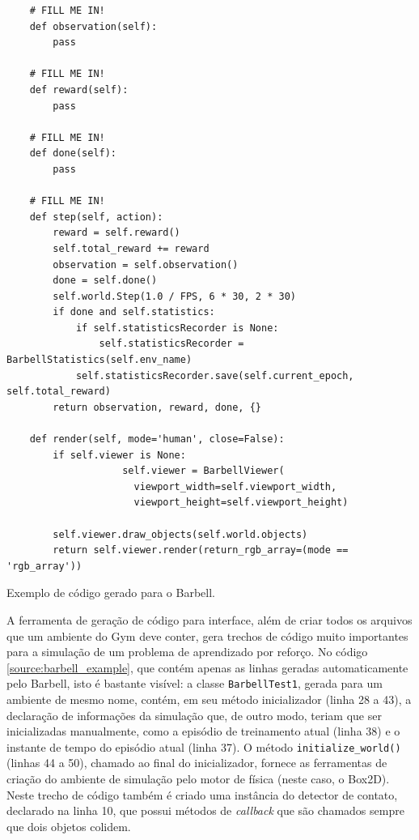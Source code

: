 \documentclass[cic,tc]{iiufrgs}
\newenvironment{longlisting}{\captionsetup{type=listing}}{}
\begin{document}
\begin{longlisting}
\begin{verbatim}
    # FILL ME IN!
    def observation(self):
        pass

    # FILL ME IN!
    def reward(self):
        pass

    # FILL ME IN!
    def done(self):
        pass

    # FILL ME IN!
    def step(self, action):
        reward = self.reward()
        self.total_reward += reward
        observation = self.observation()
        done = self.done()
        self.world.Step(1.0 / FPS, 6 * 30, 2 * 30)
        if done and self.statistics:
            if self.statisticsRecorder is None:
                self.statisticsRecorder = BarbellStatistics(self.env_name)
            self.statisticsRecorder.save(self.current_epoch, self.total_reward)
        return observation, reward, done, {}

    def render(self, mode='human', close=False):
        if self.viewer is None:
                    self.viewer = BarbellViewer(
                      viewport_width=self.viewport_width,
                      viewport_height=self.viewport_height)

        self.viewer.draw_objects(self.world.objects)
        return self.viewer.render(return_rgb_array=(mode == 'rgb_array'))

\end{verbatim}
\caption[]{Exemplo de código gerado para o Barbell.}
\label{source:barbell_example}
\end{longlisting}


A ferramenta de geração de código para interface, além de criar todos os
arquivos que um ambiente do Gym deve conter, gera trechos de código muito
importantes para a simulação de um problema de aprendizado por reforço. No
código \ref{source:barbell_example}, que contém apenas as linhas geradas
automaticamente pelo Barbell, isto é bastante visível: a classe \texttt{BarbellTest1},
gerada para um ambiente de mesmo nome, contém, em seu
método inicializador (linha 28 a 43), a declaração de informações da simulação que,
de outro modo, teriam que ser inicializadas manualmente, como a episódio de treinamento
atual (linha 38) e o instante de tempo do episódio atual (linha 37). O método
\texttt{initialize\_world()} (linhas 44 a 50), chamado ao final do inicializador,
fornece as ferramentas de criação do ambiente de simulação pelo motor de física
(neste caso, o Box2D). Neste trecho de código também é criado uma instância do
detector de contato, declarado na linha 10, que possui métodos de \textit{callback}
que são chamados sempre que dois objetos colidem.
\end{document}
